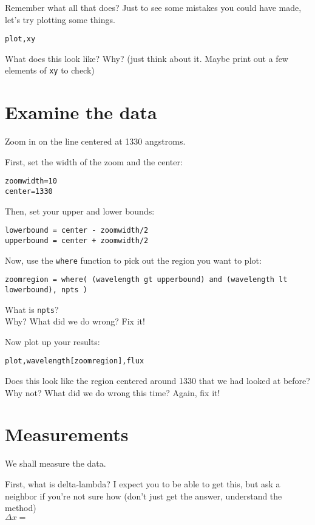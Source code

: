 \documentclass{article}
\begin{document}
\begin{spacing}{1.0}
Remember what all that does?  Just to see some mistakes you could have made, let's try plotting some things.

\verb|plot,xy|

What does this look like?  Why?  (just think about it.  Maybe print out a few elements of \verb|xy| to check)

\section{Examine the data}
Zoom in on the line centered at 1330 angstroms.

First, set the width of the zoom and the center:\\
\begin{verbatim}
zoomwidth=10
center=1330
\end{verbatim}

Then, set your upper and lower bounds:\\
\begin{verbatim}
lowerbound = center - zoomwidth/2
upperbound = center + zoomwidth/2
\end{verbatim}

Now, use the \verb|where| function to pick out the region you want to plot:
\begin{verbatim}
zoomregion = where( (wavelength gt upperbound) and (wavelength lt lowerbound), npts )
\end{verbatim}

What is \verb|npts|?  \underline{\hspace{3cm}}\\
Why?  What did we do wrong?  Fix it!

Now plot up your results:
\begin{verbatim}
plot,wavelength[zoomregion],flux
\end{verbatim}

Does this look like the region centered around 1330 that we had looked at before?  \\
Why not? What did we do wrong this time?  Again, fix it!

\section{Measurements}
We shall measure the data.

First, what is delta-lambda?  I expect you to be able to get this, but ask a
neighbor if you're not sure how (don't just get the answer, understand the
method)\\
$\Delta x=$\underline{\hspace{3cm}}


\end{spacing}
\end{document}
